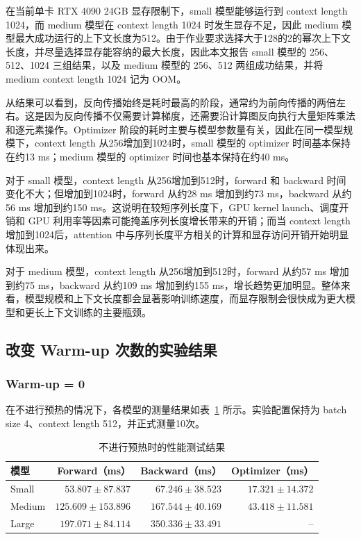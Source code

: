 \documentclass[12pt]{ctexart}
\begin{document}
在当前单卡 RTX 4090 24GB 显存限制下，small 模型能够运行到 context length 1024，而 medium 模型在 context length 1024 时发生显存不足，因此 medium 模型最大成功运行的上下文长度为512。由于作业要求选择大于128的2的幂次上下文长度，并尽量选择显存能容纳的最大长度，因此本文报告 small 模型的 256、512、1024 三组结果，以及 medium 模型的 256、512 两组成功结果，并将 medium context length 1024 记为 OOM。

从结果可以看到，反向传播始终是耗时最高的阶段，通常约为前向传播的两倍左右。这是因为反向传播不仅需要计算梯度，还需要沿计算图反向执行大量矩阵乘法和逐元素操作。Optimizer 阶段的耗时主要与模型参数量有关，因此在同一模型规模下，context length 从256增加到1024时，small 模型的 optimizer 时间基本保持在约13 ms；medium 模型的 optimizer 时间也基本保持在约40 ms。

对于 small 模型，context length 从256增加到512时，forward 和 backward 时间变化不大；但增加到1024时，forward 从约28 ms 增加到约73 ms，backward 从约56 ms 增加到约150 ms。这说明在较短序列长度下，GPU kernel launch、调度开销和 GPU 利用率等因素可能掩盖序列长度增长带来的开销；而当 context length 增加到1024后，attention 中与序列长度平方相关的计算和显存访问开销开始明显体现出来。

对于 medium 模型，context length 从256增加到512时，forward 从约57 ms 增加到约75 ms，backward 从约109 ms 增加到约155 ms，增长趋势更加明显。整体来看，模型规模和上下文长度都会显著影响训练速度，而显存限制会很快成为更大模型和更长上下文训练的主要瓶颈。

\subsection{改变 Warm-up 次数的实验结果}

\subsubsection{Warm-up = 0}

在不进行预热的情况下，各模型的测量结果如表~\ref{tab:warmup-zero} 所示。实验配置保持为 batch size 4、context length 512，并正式测量10次。

\begin{table}[htbp]
    \centering
    \caption{不进行预热时的性能测试结果}
    \label{tab:warmup-zero}
    \begin{tabular}{lrrr}
        \toprule
        模型 &
        Forward（ms） &
        Backward（ms） &
        Optimizer（ms） \\
        \midrule
        Small
        & $53.807 \pm 87.837$
        & $67.246 \pm 38.523$
        & $17.321 \pm 14.372$ \\

        Medium
        & $125.609 \pm 153.896$
        & $167.544 \pm 40.169$
        & $43.418 \pm 11.581$ \\

        Large
        & $197.071 \pm 84.114$
        & $350.336 \pm 33.491$
        & -- \\
        \bottomrule
    \end{tabular}
\end{table}
\end{document}
